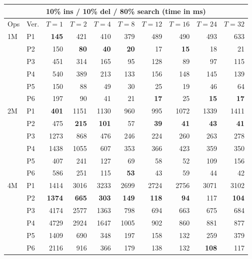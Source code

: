 \begin{tabular}{llrrrrrrrr}
\toprule
\multicolumn{10}{c}{\textbf{10\% ins / 10\% del / 80\% search} (time in ms)} \\
\midrule
Ops & Ver. & $T{=}1$ & $T{=}2$ & $T{=}4$ & $T{=}8$ & $T{=}12$ & $T{=}16$ & $T{=}24$ & $T{=}32$ \\
\midrule
1M & P1 & \textbf{145} & 421 & 410 & 379 & 489 & 490 & 493 & 633 \\
 & P2 & 150 & \textbf{80} & \textbf{40} & \textbf{20} & 17 & \textbf{15} & 18 & 21 \\
 & P3 & 451 & 314 & 165 & 95 & 128 & 89 & 97 & 115 \\
 & P4 & 540 & 389 & 213 & 133 & 156 & 148 & 145 & 139 \\
 & P5 & 150 & 88 & 49 & 30 & 25 & 19 & 46 & 64 \\
 & P6 & 197 & 90 & 41 & 21 & \textbf{17} & 25 & \textbf{15} & \textbf{17} \\
\midrule
2M & P1 & \textbf{401} & 1151 & 1130 & 960 & 995 & 1072 & 1339 & 1411 \\
 & P2 & 475 & \textbf{215} & \textbf{101} & 57 & \textbf{39} & \textbf{41} & \textbf{43} & \textbf{41} \\
 & P3 & 1273 & 868 & 476 & 246 & 224 & 260 & 263 & 278 \\
 & P4 & 1438 & 1055 & 607 & 353 & 366 & 423 & 359 & 350 \\
 & P5 & 407 & 241 & 127 & 69 & 58 & 52 & 109 & 156 \\
 & P6 & 586 & 251 & 115 & \textbf{53} & 43 & 59 & 44 & 42 \\
\midrule
4M & P1 & 1414 & 3016 & 3233 & 2699 & 2724 & 2756 & 3071 & 3102 \\
 & P2 & \textbf{1374} & \textbf{665} & \textbf{303} & \textbf{149} & \textbf{118} & \textbf{94} & 117 & \textbf{104} \\
 & P3 & 4174 & 2577 & 1363 & 798 & 694 & 663 & 675 & 684 \\
 & P4 & 4729 & 2924 & 1647 & 1005 & 902 & 860 & 881 & 877 \\
 & P5 & 1409 & 690 & 348 & 197 & 158 & 132 & 259 & 379 \\
 & P6 & 2116 & 916 & 366 & 179 & 138 & 132 & \textbf{108} & 117 \\
\bottomrule
\end{tabular}
\vspace{1em}

